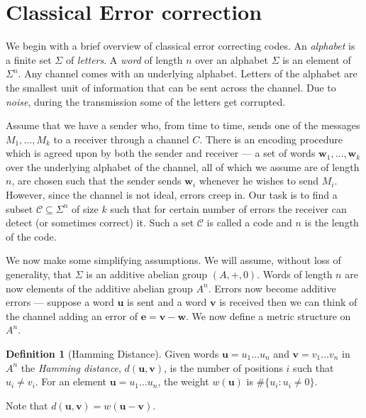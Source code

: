 \documentclass[11pt,twoside]{article}
\theoremstyle{definition}
\newtheorem{definition}[theorem]{Definition}
\theoremstyle{remark}
\newcommand{\Weight}[1]{\ensuremath{w\left(#1\right)}}
\newcommand{\Dist}[2]{\ensuremath{d\left(#1,#2\right)}}
\begin{document}
\section{Classical Error correction}

We begin with a brief overview of classical error correcting codes.
An \emph{alphabet} is a finite set $\Sigma$ of \emph{letters}. A
\emph{word} of length $n$ over an alphabet $\Sigma$ is an element of
$\Sigma^n$.  Any channel comes with an underlying alphabet.  Letters
of the alphabet are the smallest unit of information that can be sent
across the channel. Due to \emph{noise}, during the transmission some
of the letters get corrupted.

Assume that we have a sender who, from time to time, sends one of the
messages $M_1,\ldots,M_k$ to a receiver through a channel $C$.  There
is an encoding procedure which is agreed upon by both the sender and
receiver --- a set of words $\mathbf{w}_1,\ldots,\mathbf{w}_k$ over
the underlying alphabet of the channel, all of which we assume are of
length $n$, are chosen such that the sender sends $\mathbf{w}_i$
whenever he wishes to send $M_i$.  However, since the channel is not
ideal, errors creep in. Our task is to find a subset $\mathcal{C}
\subseteq \Sigma^n$ of size $k$ such that for certain number of errors
the receiver can detect (or sometimes correct) it.  Such a set
$\mathcal{C}$ is called a code and $n$ is the length of the code.

We now make some simplifying assumptions. We will assume, without loss
of generality, that $\Sigma$ is an additive abelian group $(A,+,0)$.
Words of length $n$ are now elements of the additive abelian group
$A^n$.  Errors now become additive errors --- suppose a word
$\mathbf{u}$ is sent and a word $\mathbf{v}$ is received then we can
think of the channel adding an error of $\mathbf{e} = \mathbf{v} -
\mathbf{w}$.  We now define a metric structure on $A^n$.

\begin{definition}[Hamming Distance]
  Given words $\mathbf{u} = u_1 \ldots u_n$ and $\mathbf{v} =
  v_1\ldots v_n$ in $A^n$ the \emph{Hamming distance},
  $\Dist{\mathbf{u}}{\mathbf{v}}$, is the number of positions $i$ such
  that $u_i \neq v_i$. For an element $\mathbf{u} = u_1\ldots u_n$,
  the weight $\Weight{\mathbf{u}}$ is $\# \{ u_i : u_i \neq 0 \}$.
\end{definition}

Note that $\Dist{\mathbf{u}}{\mathbf{v}} = \Weight{\mathbf{u} -
  \mathbf{v}}$.
\end{document}
